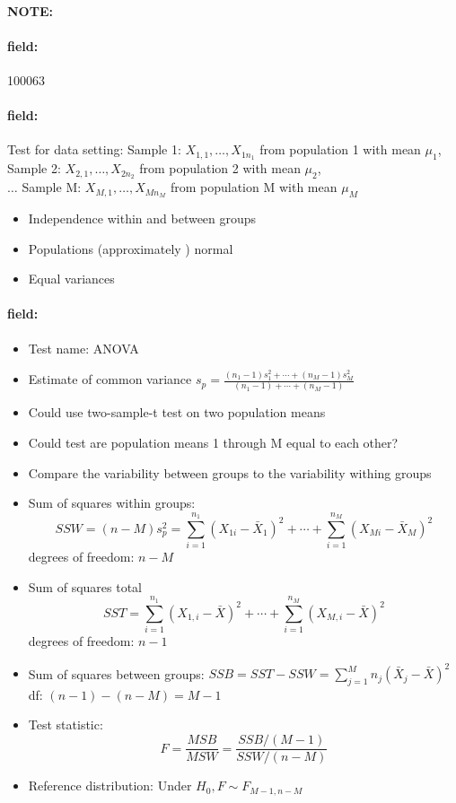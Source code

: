 \documentclass[12pt]{article}
\newenvironment{note}{\paragraph{NOTE:}}{}
\newenvironment{field}{\paragraph{field:}}{}
\begin{document}
\begin{note} \begin{field} \tiny 100063 \end{field}
 \begin{field}
  Test for data setting: Sample 1: $X_{1,1}, \ldots , X_{1n_1}$ from population 1 with mean $\mu_1$,\\
  Sample 2: $X_{2,1}, \ldots , X_{2n_2}$ from population 2 with mean $\mu_2$,\\ $\ldots $ Sample M: $X_{M,1}, \ldots , X_{Mn_M}$ from population M with mean $\mu_M$
  \begin{itemize}
   \item Independence within and between groups
   \item Populations (approximately ) normal
   \item Equal variances
  \end{itemize}
 \end{field}
 \begin{field}
  \begin{itemize}
   \item Test name: ANOVA
   \item Estimate of common variance $s_p = \frac{(n_1-1)s_1^2 + \cdots + (n_M -1)s_M^2}{(n_1-1) + \cdots + (n_M-1)}$
   \item Could use two-sample-t test on two population means
   \item Could test are population means 1 through M equal to each other?
   \item Compare the variability between groups to the variability withing groups
   \item Sum of squares within groups:
         $$ SSW = (n-M)s_p^2  = \sum_{i=1}^{n_1}(X_{1i} - \bar{X}_1)^2 + \cdots +  \sum_{i=1}^{n_M}(X_{Mi} - \bar{X}_M)^2$$
         degrees of freedom: $n-M$
   \item Sum of squares total
         $$ SST  = \sum_{i=1}^{n_1}(X_{1,i} - \bar{X})^2 + \cdots + \sum_{i=1}^{n_M} (X_{M,i} - \bar{X})^2$$
         degrees of freedom: $n-1$
   \item Sum of squares between groups: $ SSB = SST - SSW = \sum_{j=1}^Mn_j(\bar{X}_j - \bar{X})^2$ df: $(n-1) - (n-M) = M-1$
   \item Test statistic: $$ F = \frac{MSB}{MSW} = \frac{SSB/(M-1)}{SSW/(n-M)} $$
   \item Reference distribution: Under $H_0, F \sim F_{M-1, n-M}$
  \end{itemize}
 \end{field}
\end{note}
\end{document}
